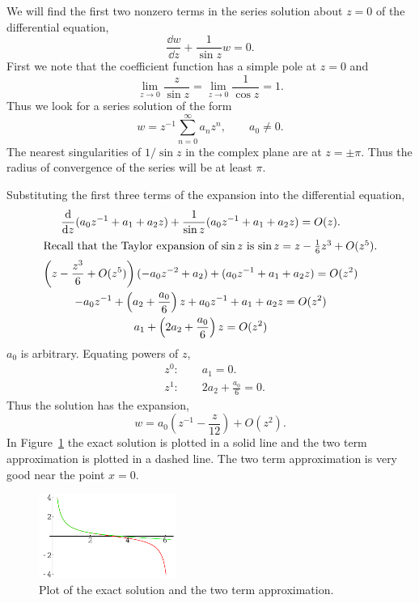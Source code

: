 \begin{Example}
  We will find the first two nonzero terms in the series solution about $z = 0$ 
  of the differential equation,
  \[ 
  \frac{\dd w}{\dd z} + \frac{1}{\sin z} w = 0.
  \]
  First we note that the coefficient function has a simple pole at $z = 0$ and
  \[ 
  \lim_{z \to 0} \frac{z}{\sin z} = \lim_{z \to 0} \frac{1}{\cos z} = 1.
  \]
  Thus we look for a series solution of the form
  \[ 
  w = z^{-1} \sum_{n=0}^\infty a_n z^n, \qquad a_0 \neq 0.
  \]
  The nearest singularities of $1 / \sin z$ in the complex plane are at 
  $z = \pm \pi$.  Thus the radius of convergence of the series will
  be at least $\pi$.

  Substituting the first three terms of the expansion into the differential 
  equation,
  \begin{gather*}
    \frac{\mathrm{d}}{\mathrm{d} z}(a_0 z^{-1} + a_1 + a_2 z) 
    + \frac{1}{\sin z} (a_0 z^{-1} + a_1 + a_2 z) = O(z). \\
    \intertext{Recall that the Taylor expansion of $\sin z$ is 
      $\sin z = z - \frac{1}{6}z^3 + O(z^5)$.}
    \left(z - \frac{z^3}{6} + O(z^5)\right)
    (-a_0 z^{-2} + a_2) + (a_0 z^{-1} + a_1 + a_2 z) = O(z^2)\\
    -a_0 z^{-1} + \left(a_2 + \frac{a_0}{6}\right)z + a_0 z^{-1} + a_1 + a_2 z 
    = O(z^2) \\
    a_1 + \left(2a_2 + \frac{a_0}{6}\right) z = O(z^2)
  \end{gather*}
  $a_0$ is arbitrary.  Equating powers of $z$,
  \begin{align*}
    &z^0: \qquad a_1 = 0. \\
    &z^1: \qquad 2a_2 + \frac{a_0}{6} = 0.
  \end{align*}
  Thus the solution has the expansion,
  \[
  \boxed{
    w = a_0 \left(z^{-1} - \frac{z}{12} \right) + O(z^2).
    }
  \]
  In Figure~\ref{figure foode oosc} the exact solution is plotted in a solid 
  line and the two term approximation is plotted in a dashed line.  The two
  term approximation is very good near the point $x = 0$.

  \begin{figure}[tb!]
    \begin{center}
      \includegraphics[width=0.4\textwidth]{ode/first_order/oosc}
    \end{center}
    \caption{Plot of the exact solution and the two term approximation.}
    \label{figure foode oosc}
  \end{figure}

\end{Example}














